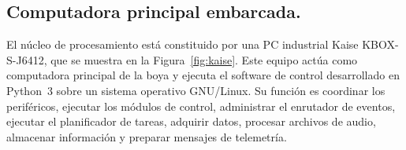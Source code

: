 %
%
%
%
%


\vspace{10px}
\subsection{Computadora principal embarcada.}

El núcleo de procesamiento está constituido por una PC industrial Kaise KBOX-S-J6412, que se muestra en la Figura~\ref{fig:kaise}. Este equipo actúa como computadora principal de la boya y ejecuta el software de control desarrollado en Python~3 sobre un sistema operativo GNU/Linux. Su función es coordinar los periféricos, ejecutar los módulos de control, administrar el enrutador de eventos, ejecutar el planificador de tareas, adquirir datos, procesar archivos de audio, almacenar información y preparar mensajes de telemetría.

